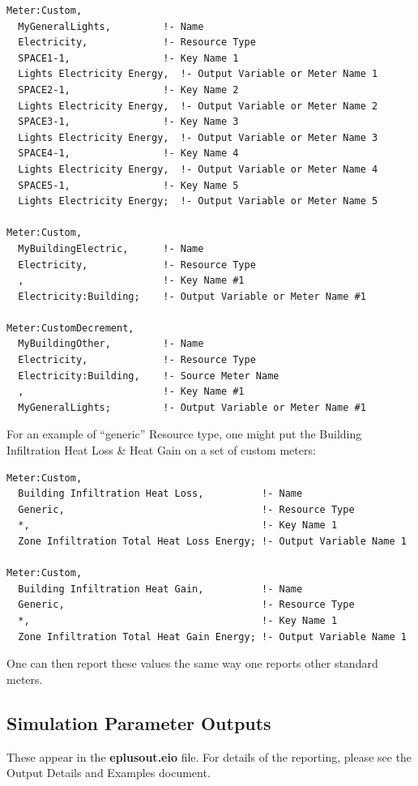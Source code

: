\begin{lstlisting}
Meter:Custom,
  MyGeneralLights,         !- Name
  Electricity,             !- Resource Type
  SPACE1-1,                !- Key Name 1
  Lights Electricity Energy,  !- Output Variable or Meter Name 1
  SPACE2-1,                !- Key Name 2
  Lights Electricity Energy,  !- Output Variable or Meter Name 2
  SPACE3-1,                !- Key Name 3
  Lights Electricity Energy,  !- Output Variable or Meter Name 3
  SPACE4-1,                !- Key Name 4
  Lights Electricity Energy,  !- Output Variable or Meter Name 4
  SPACE5-1,                !- Key Name 5
  Lights Electricity Energy;  !- Output Variable or Meter Name 5

Meter:Custom,
  MyBuildingElectric,      !- Name
  Electricity,             !- Resource Type
  ,                        !- Key Name #1
  Electricity:Building;    !- Output Variable or Meter Name #1

Meter:CustomDecrement,
  MyBuildingOther,         !- Name
  Electricity,             !- Resource Type
  Electricity:Building,    !- Source Meter Name
  ,                        !- Key Name #1
  MyGeneralLights;         !- Output Variable or Meter Name #1
\end{lstlisting}

For an example of ``generic'' Resource type, one might put the Building Infiltration Heat Loss \& Heat Gain on a set of custom meters:

\begin{lstlisting}
Meter:Custom,
  Building Infiltration Heat Loss,          !- Name
  Generic,                                  !- Resource Type
  *,                                        !- Key Name 1
  Zone Infiltration Total Heat Loss Energy; !- Output Variable Name 1

Meter:Custom,
  Building Infiltration Heat Gain,          !- Name
  Generic,                                  !- Resource Type
  *,                                        !- Key Name 1
  Zone Infiltration Total Heat Gain Energy; !- Output Variable Name 1
\end{lstlisting}

One can then report these values the same way one reports other standard meters.

\subsection{Simulation Parameter Outputs}\label{simulation-parameter-outputs}

These appear in the \textbf{eplusout.eio} file. For details of the reporting, please see the Output Details and Examples document.
